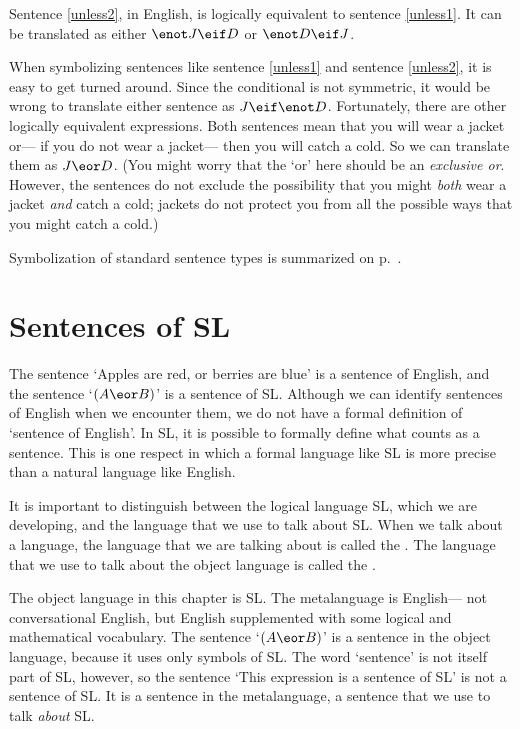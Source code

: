 Sentence \ref{unless2}, in English, is logically equivalent to sentence \ref{unless1}. It can be translated as either $\enot J \eif D$ or $\enot D \eif J$.

When symbolizing sentences like sentence \ref{unless1} and sentence \ref{unless2}, it is easy to get turned around. Since the conditional is not symmetric, it would be wrong to translate either sentence as $J \eif \enot D$. Fortunately, there are other logically equivalent expressions. Both sentences mean that you will wear a jacket or--- if you do not wear a jacket--- then you will catch a cold. So we can translate them as $J \eor D$. (You might worry that the `or' here should be an \emph{exclusive or}. However, the sentences do not exclude the possibility that you might \emph{both} wear a jacket \emph{and} catch a cold; jackets do not protect you from all the possible ways that you might catch a cold.)



Symbolization of standard sentence types is summarized on p.~\pageref{app.symbolization}.





\section{Sentences of SL}
The sentence `Apples are red, or berries are blue' is a sentence of English, and the sentence `$(A\eor B)$' is a sentence of SL. Although we can identify sentences of English when we encounter them, we do not have a formal definition of `sentence of English'. In SL, it is possible to formally define what counts as a sentence. This is one respect in which a formal language like SL is more precise than a natural language like English.

It is important to distinguish between the logical language SL, which we are developing, and the language that we use to talk about SL. When we talk about a language, the language that we are talking about is called the . The language that we use to talk about the object language is called the .
\label{def.metalanguage}

The object language in this chapter is SL. The metalanguage is English--- not conversational English, but English supplemented with some logical and mathematical vocabulary. The sentence `$(A\eor B)$' is a sentence in the object language, because it uses only symbols of SL. The word `sentence' is not itself part of SL, however, so the sentence `This expression is a sentence of SL' is not a sentence of SL. It is a sentence in the metalanguage, a sentence that we use to talk \emph{about} SL.

